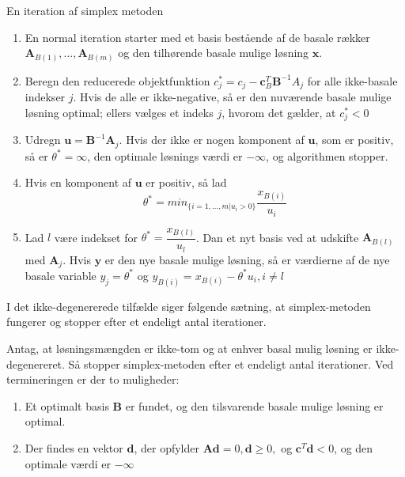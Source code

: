 En iteration af simplex metoden
\begin{enumerate}
\item En normal iteration starter med et basis bestående af de basale rækker $\textbf{A}_{B(1)},\ldots,\textbf{A}_{B(m)}$ og den tilhørende basale mulige løsning $\textbf{x}$.
\item Beregn den reducerede objektfunktion $c_j^* = c_j - \mathbf{c}_B^T \textbf{B}^{-1}A_j$ for alle ikke-basale indekser $j$. Hvis de alle er ikke-negative, så er den nuværende basale mulige løsning optimal; ellers vælges et indeks $j$, hvorom det gælder, at $c^*_j<0$
\item Udregn $\textbf{u}=\textbf{B}^{-1}\textbf{A}_j$. Hvis der ikke er nogen komponent af $\textbf{u}$, som er positiv, så er $\theta ^*=\infty$, den optimale løsnings værdi er $-\infty$, og algorithmen stopper.
\item Hvis en komponent af $\textbf{u}$ er positiv, så lad 
$$\theta^*= min_{ \{i=1,\ldots,m|u_i>0 \} }        \dfrac{x_{B(i)}}{u_i}$$
\item Lad $l$ være indekset for $\theta^*=  \dfrac{x_{B(l)}}{u_l}$. Dan et nyt basis ved at udskifte $\textbf{A}_{B(l)}$ med $\textbf{A}_j$. Hvis $\textbf{y}$ er den nye basale mulige løsning, så er værdierne af de nye basale variable $y_j=\theta^*$ og $y_{B(i)}=x_{B(i)}-\theta^*u_i,i\neq l$
\end{enumerate}
%
%
I det ikke-degenererede tilfælde siger følgende sætning, at simplex-metoden fungerer og stopper efter et endeligt antal iterationer.
\begin{thm}{}{}
Antag, at løsningsmængden er ikke-tom og at enhver basal mulig løsning er ikke-degenereret.
Så stopper simplex-metoden efter et endeligt antal iterationer. 
Ved termineringen er der to muligheder:
\begin{enumerate}[label = (\alph*)]
\item Et optimalt basis $\textbf{B}$ er fundet, og den tilsvarende basale mulige løsning er optimal.
\item Der findes en vektor $\textbf{d}$, der opfylder $\textbf{Ad}=0,\textbf{d}\geq 0,$ og $\textbf{c}^T\textbf{d}<0$, og den optimale værdi er $-\infty$
\end{enumerate}
\end{thm}
%
